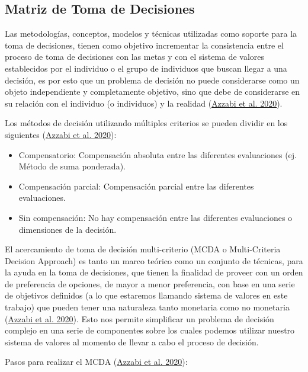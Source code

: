 \documentclass[
]{book}
\providecommand{\tightlist}{%
  \setlength{\itemsep}{0pt}\setlength{\parskip}{0pt}}
\begin{document}
\newpage

\hypertarget{matriz-de-toma-de-decisiones}{%
\subsection{Matriz de Toma de Decisiones}\label{matriz-de-toma-de-decisiones}}

Las metodologías, conceptos, modelos y técnicas utilizadas como soporte para la toma de decisiones, tienen como objetivo incrementar la consistencia entre el proceso de toma de decisiones con las metas y con el sistema de valores establecidos por el individuo o el grupo de individuos que buscan llegar a una decisión, es por esto que un problema de decisión no puede considerarse como un objeto independiente y completamente objetivo, sino que debe de considerarse en su relación con el individuo (o individuos) y la realidad (\protect\hyperlink{ref-Azzabi2020}{Azzabi et al. 2020}).

Los métodos de decisión utilizando múltiples criterios se pueden dividir en los siguientes (\protect\hyperlink{ref-Azzabi2020}{Azzabi et al. 2020}):

\begin{itemize}
\tightlist
\item
  Compensatorio: Compensación absoluta entre las diferentes evaluaciones (ej. Método de suma ponderada).
\item
  Compensación parcial: Compensación parcial entre las diferentes evaluaciones.
\item
  Sin compensación: No hay compensación entre las diferentes evaluaciones o dimensiones de la decisión.
\end{itemize}

El acercamiento de toma de decisión multi-criterio (MCDA o Multi-Criteria Decision Approach) es tanto un marco teórico como un conjunto de técnicas, para la ayuda en la toma de decisiones, que tienen la finalidad de proveer con un orden de preferencia de opciones, de mayor a menor preferencia, con base en una serie de objetivos definidos (a lo que estaremos llamando sistema de valores en este trabajo) que pueden tener una naturaleza tanto monetaria como no monetaria (\protect\hyperlink{ref-Azzabi2020}{Azzabi et al. 2020}). Esto nos permite simplificar un problema de decisión complejo en una serie de componentes sobre los cuales podemos utilizar nuestro sistema de valores al momento de llevar a cabo el proceso de decisión.

Pasos para realizar el MCDA (\protect\hyperlink{ref-Azzabi2020}{Azzabi et al. 2020}):
\end{document}
